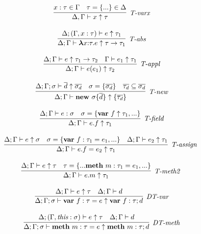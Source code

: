\begin{figure}
\centering
\[
\begin{array}{c}

\infer[\textit{T-varx}]
	{\Delta,\Gamma \vdash x\uparrow\tau } 
	{x:\tau \in \Gamma & \tau= \{...\} \in \Delta}\\[3ex]

\infer[\textit{T-abs}]
	{\Delta; \Gamma \vdash  \boldsymbol\lambda x{:}\tau . e \uparrow \tau \rightarrow \tau_1} 
	{\Delta; (\Gamma, x:\tau) \vdash e\uparrow\tau_1 }\\[3ex]

\infer[\textit{T-appl}]
	{\Delta; \Gamma \vdash  e(e_1) \uparrow\tau_2} 
	{\Delta; \Gamma \vdash e \uparrow \tau_1 \rightarrow \tau_2 & \Gamma \vdash e_1 \uparrow \tau_1}\\[3ex]

\infer[\textit{T-new}]
	{\Delta; \Gamma \vdash \keyw{new}~\sigma \{ \overline{d} \} \uparrow \{ \overline{\tau_d} \}}
	{\Delta; \Gamma; \sigma \vdash \overline{d} \uparrow \overline{\sigma_d} & \sigma = \{ \overline{\sigma_d} \} & \overline{\tau_d} \subseteq \overline{\sigma_d}} \\[3ex]

\infer[\textit{T-field}]
	{\Delta; \Gamma \vdash  e.f \uparrow \tau_1} 
	{\Delta; \Gamma \vdash e:\sigma & \sigma= \{\keyw{var}~ f \uparrow \tau_1,... \} }\\[3ex]

\infer[\textit{T-assign }]
	{\Delta; \Gamma \vdash  e.f=e_2 \uparrow \tau_1} 
	{\Delta; \Gamma \vdash e \uparrow \sigma & \sigma= \{\keyw{var}~ f:\tau_1=e_1,... \} & \Delta; \Gamma\vdash e_2 \uparrow\tau_1 }\\[3ex]

\infer[\textit{T-meth2 }]
	{\Delta; \Gamma \vdash  e.m \uparrow\tau_1} 
	{\Delta; \Gamma \vdash e \uparrow\tau & \tau=\{...\keyw{meth}~ m:\tau_1=e_1,... \} }\\[3ex]

\infer[\textit{DT-var}]
	{\Delta; \Gamma; \sigma \vdash \keyw{var}~ f:\tau = e \uparrow \keyw{var}~ f:\tau; d }
	{\Delta; \Gamma \vdash e \uparrow \tau & \Delta; \Gamma \vdash d} \\[3ex]
	
\infer[\textit{DT-meth}]
	{\Delta; \Gamma; \sigma \vdash \keyw{meth}~ m:\tau = e \uparrow \keyw{meth}~ m:\tau; d }
	{\Delta; (\Gamma, \textit{this}:\sigma) \vdash e  \uparrow \tau & \Delta; \Gamma \vdash d } \\[3ex]


\end{array}\]
\end{figure}
